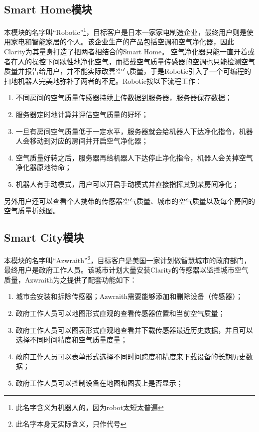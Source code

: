 \subsection{Smart Home模块}
本模块的名字叫“Robotic”\footnote{此名字含义为机器人的，因为robot太短太普遍}，目标客户是日本一家家电制造企业，最终用户则是使用家电和智能家居的个人。该企业生产的产品包括空调和空气净化器，因此Clarity为其量身打造了把两者相结合的Smart Home。
空气净化器只能一直开着或者在人的操控下间歇性地净化空气，而搭载空气质量传感器的空调也只能检测空气质量并报告给用户，并不能实际改善空气质量，于是Robotic引入了一个可编程的扫地机器人完美地弥补了两者的不足。Robotic按以下流程工作：
\begin{enumerate}
  \item 不同房间的空气质量传感器持续上传数据到服务器，服务器保存数据；
  \item 服务器定时地计算并评估空气质量的好坏；
  \item 一旦有房间空气质量低于一定水平，服务器就会给机器人下达净化指令，机器人会移动到对应的房间并开启空气净化器；
  \item 空气质量好转之后，服务器再给机器人下达停止净化指令，机器人会关掉空气净化器原地待命；
  \item 机器人有手动模式，用户可以开启手动模式并直接指挥其到某房间净化；
\end{enumerate}

另外用户还可以查看个人携带的传感器空气质量、城市的空气质量以及每个房间的空气质量折线图。

\subsection{Smart City模块}
本模块的名字叫“Azwraith”\footnote{此名字本身无实际含义，只作代号}，目标客户是美国一家计划做智慧城市的政府部门，最终用户是政府工作人员。该城市计划大量安装Clarity的传感器以监控城市空气质量，Azwraith为之提供了配套功能如下：
\begin{enumerate}
  \item 城市会安装和拆除传感器；Azwraith需要能够添加和删除设备（传感器）；
  \item 政府工作人员可以地图形式直观的查看传感器位置和当前空气质量；
  \item 政府工作人员可以图表形式直观地查看并下载传感器最近历史数据，并且可以选择不同时间精度和空气质量度量；
  \item 政府工作人员可以表单形式选择不同时间跨度和精度来下载设备的长期历史数据；
  \item 政府工作人员可以控制设备在地图和图表上是否显示；
\end{enumerate}


